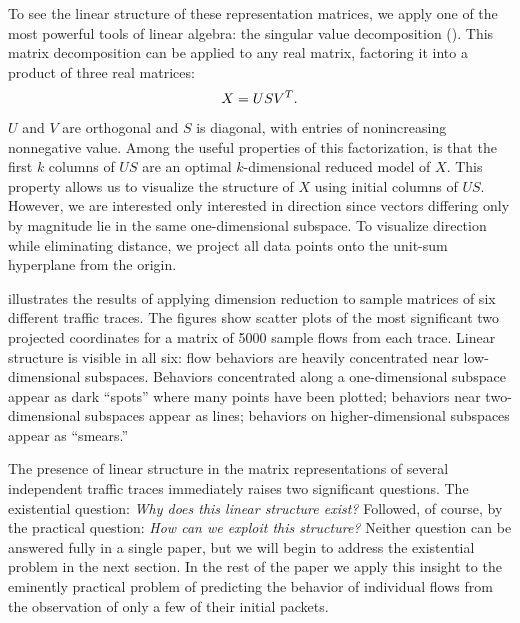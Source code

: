 \documentclass[conference]{IEEEtran}
\begin{document}

To see the linear structure of these representation matrices, we apply one of the most powerful tools of linear algebra:
the singular value decomposition ().
This matrix decomposition can be applied to any real matrix, factoring it into a product of three real matrices:
\begin{align}
  X = US{V}^T.
\end{align}
$U$ and $V$ are orthogonal and $S$ is diagonal, with entries of nonincreasing nonnegative value.
Among the useful properties of this factorization, is that the first $k$ columns of $US$ are an optimal $k$-dimensional reduced model of $X$.\svdnote
This property allows us to visualize the structure of $X$ using initial columns of $US$.
However, we are interested only interested in direction since
vectors differing only by magnitude lie in the same one-dimensional subspace.
To visualize direction while eliminating distance, we project all data points onto the unit-sum hyperplane from the origin.\projectionnote

 illustrates the results of applying  dimension reduction to sample matrices of six different traffic traces.
The figures show scatter plots of the most significant two projected  coordinates for a matrix of 5000 sample flows from each trace.
Linear structure is visible in all six:
flow behaviors are heavily concentrated near low-dimensional subspaces.
Behaviors concentrated along a one-dimensional subspace appear as dark ``spots'' where many points have been plotted;
behaviors near two-dimensional subspaces appear as lines;
behaviors on higher-dimensional subspaces appear as ``smears.''

The presence of linear structure in the matrix representations of several independent traffic traces immediately raises two significant questions.
The existential question: \emph{Why does this linear structure exist?}
Followed, of course, by the practical question: \emph{How can we exploit this structure?}
Neither question can be answered fully in a single paper, but we will begin to address the existential problem in the next section.
In the rest of the paper we apply this insight to the eminently practical problem of predicting the behavior of individual flows from the observation of only a few of their initial packets.
\end{document}
